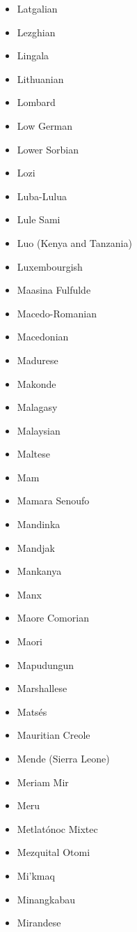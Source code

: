 \documentclass[paper=a4, 10pt]{scrbook}
\begin{document}
\begin{multicols}{3}
\begin{itemize}
        \item Latgalian
        \item Lezghian
        \item Lingala
        \item Lithuanian
        \item Lombard
        \item Low German
        \item Lower Sorbian
        \item Lozi
        \item Luba-Lulua
        \item Lule Sami
        \item Luo (Kenya and Tanzania)
        \item Luxembourgish
        \item Maasina Fulfulde
        \item Macedo-Romanian
        \item Macedonian
        \item Madurese
        \item Makonde
        \item Malagasy
        \item Malaysian
        \item Maltese
        \item Mam
        \item Mamara Senoufo
        \item Mandinka
        \item Mandjak
        \item Mankanya
        \item Manx
        \item Maore Comorian
        \item Maori
        \item Mapudungun
        \item Marshallese
        \item Matsés
        \item Mauritian Creole
        \item Mende (Sierra Leone)
        \item Meriam Mir
        \item Meru
        \item Metlatónoc Mixtec
        \item Mezquital Otomi
        \item Mi’kmaq
        \item Minangkabau
        \item Mirandese

\end{itemize}
\end{multicols}
\end{document}
